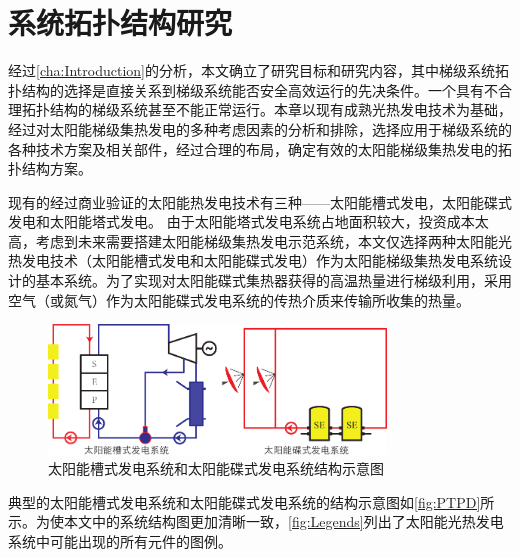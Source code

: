 \chapter{系统拓扑结构研究}
\label{cha:SystemTopology}

经过\autoref{cha:Introduction}的分析，本文确立了研究目标和研究内容，其中梯级系统拓扑结构的选择是直接关系到梯级系统能否安全高效运行的先决条件。一个具有不合理拓扑结构的梯级系统甚至不能正常运行。本章以现有成熟光热发电技术为基础，经过对太阳能梯级集热发电的多种考虑因素的分析和排除，选择应用于梯级系统的各种技术方案及相关部件，经过合理的布局，确定有效的太阳能梯级集热发电的拓扑结构方案。

现有的经过商业验证的太阳能热发电技术有三种——太阳能槽式发电，太阳能碟式发电和太阳能塔式发电。
由于太阳能塔式发电系统占地面积较大，投资成本太高，考虑到未来需要搭建太阳能梯级集热发电示范系统，本文仅选择两种太阳能光热发电技术（太阳能槽式发电和太阳能碟式发电）作为太阳能梯级集热发电系统设计的基本系统。为了实现对太阳能碟式集热器获得的高温热量进行梯级利用，采用空气（或氮气）作为太阳能碟式发电系统的传热介质来传输所收集的热量。
\begin{figure}[htbp]
\centering
\includegraphics[width=0.8\textwidth]{fig/PTPD.pdf}
\caption{太阳能槽式发电系统和太阳能碟式发电系统结构示意图}
\label{fig:PTPD}
\end{figure}
典型的太阳能槽式发电系统和太阳能碟式发电系统的结构示意图如\autoref{fig:PTPD}所示。为使本文中的系统结构图更加清晰一致，\autoref{fig:Legends}列出了太阳能光热发电系统中可能出现的所有元件的图例。

